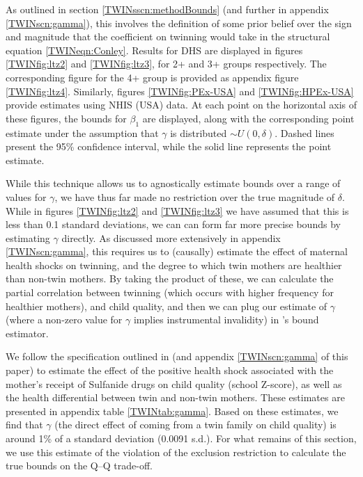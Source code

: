 \documentclass[subeqn]{article}
\begin{document}
\begin{spacing}{1.4}
As outlined in section \ref{TWINsscn:methodBounds} (and further in appendix
\ref{TWINscn:gamma}), this involves the definition of some prior belief over 
the sign and magnitude that the coefficient on twinning would take in the 
structural equation \ref{TWINeqn:Conley}. Results for DHS are displayed in 
figures \ref{TWINfig:ltz2} and \ref{TWINfig:ltz3}, for 2+ and 3+ groups 
respectively. The corresponding figure for the 4+ group is provided as appendix
figure \ref{TWINfig:ltz4}. Similarly, figures \ref{TWINfig:PEx-USA} and
\ref{TWINfig:HPEx-USA} provide estimates using NHIS (USA) data. At each point 
on the horizontal axis of these figures, the bounds for $\beta_1$ are displayed, 
along with the corresponding point estimate under the assumption that $\gamma$ 
is distributed $\sim U(0,\delta)$. Dashed lines present the 95\% confidence 
interval, while the solid line represents the point estimate.

While this technique allows us to agnostically estimate bounds over a range 
of values for $\gamma$, we have thus far made no restriction over the true 
magnitude of $\delta$.  While in figures \ref{TWINfig:ltz2} and 
\ref{TWINfig:ltz3} we have assumed that this is less than 0.1 standard 
deviations, we can can form far more precise bounds by estimating $\gamma$ 
directly.  As discussed more extensively in appendix \ref{TWINscn:gamma}, this 
requires us to (causally) estimate the effect of maternal health shocks on 
twinning, and the degree to which twin mothers are healthier than non-twin
mothers.  By taking the product of these, we can calculate the partial 
correlation between twinning (which occurs with higher frequency for healthier 
mothers), and child quality, and then we can plug our estimate of $\gamma$ 
(where a non-zero value for $\gamma$ implies instrumental invalidity) in 
\citeauthor{Conleyetal2012}'s bound estimator.

We follow the specification outlined in \citet{BhalotraVenkataramani2014}
(and appendix \ref{TWINscn:gamma} of this paper) to estimate the effect of 
the positive health shock associated with the mother's receipt of Sulfanide 
drugs on child quality (school Z-score), as well as the health differential
between twin and non-twin mothers.  These estimates are presented in appendix 
table \ref{TWINtab:gamma}.  Based on these estimates, we find that $\gamma$
(the direct effect of coming from a twin family on child quality) is around
1\% of a standard deviation (0.0091 s.d.).  For what remains of this section, 
we use this estimate of the violation of the exclusion restriction to 
calculate the true bounds on the Q--Q trade-off.


\end{spacing}
\end{document}
